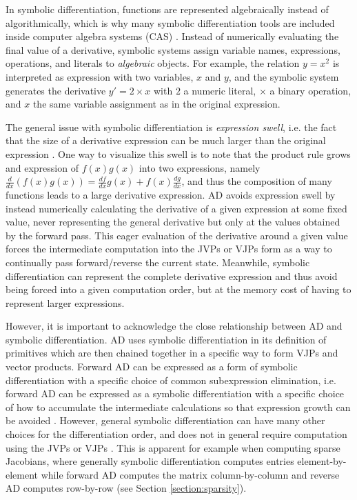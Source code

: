 In symbolic differentiation, functions are represented algebraically instead of algorithmically, which is why many symbolic differentiation tools are included inside computer algebra systems (CAS) \cite{Symbolics_jl_2022}. 
Instead of numerically evaluating the final value of a derivative, symbolic systems assign variable names, expressions, operations, and literals to \textit{algebraic} objects. 
For example, the relation $y = x^2$ is interpreted as expression with two variables, $x$ and $y$, and the symbolic system generates the derivative $y' = 2 \times x$ with $2$ a numeric literal, $\times$ a binary operation, and $x$ the same variable assignment as in the original expression.

The general issue with symbolic differentiation is \textit{expression swell}, i.e. the fact that the size of a derivative expression can be much larger than the original expression \cite{Baydin_Pearlmutter_Radul_Siskind_2015}. 
One way to visualize this swell is to note that the product rule grows and expression of $f(x)g(x)$ into two expressions, namely $\frac{d}{dx}(f(x)g(x)) = \frac{df}{dx}g(x) + f(x)\frac{dg}{dx}$, and thus the composition of many functions leads to a large derivative expression. 
AD avoids expression swell by instead numerically calculating the derivative of a given expression at some fixed value, never representing the general derivative but only at the values obtained by the forward pass. 
This eager evaluation of the derivative around a given value forces the intermediate computation into the JVPs or VJPs form as a way to continually pass forward/reverse the current state. 
Meanwhile, symbolic differentiation can represent the complete derivative expression and thus avoid being forced into a given computation order, but at the memory cost of having to represent larger expressions.

However, it is important to acknowledge the close relationship between AD and symbolic differentiation.
AD uses symbolic differentiation in its definition of primitives which are then chained together in a specific way to form VJPs and vector products. 
Forward AD can be expressed as a form of symbolic differentiation with a specific choice of common subexpression elimination, i.e. forward AD can be expressed as a symbolic differentiation with a specific choice of how to accumulate the intermediate calculations so that expression growth can be avoided \cite{juedes1991taxonomy, Elliott_2018, Laue2020, Dürrbaum_Klier_Hahn_2002}.
However, general symbolic differentiation can have many other choices for the differentiation order, and does not in general require computation using the JVPs or VJPs \cite{Baydin_Pearlmutter_Radul_Siskind_2015}. 
This is apparent for example when computing sparse Jacobians, where generally symbolic differentiation computes entries element-by-element while forward AD computes the matrix column-by-column and reverse AD computes row-by-row (see Section \ref{section:sparsity}).